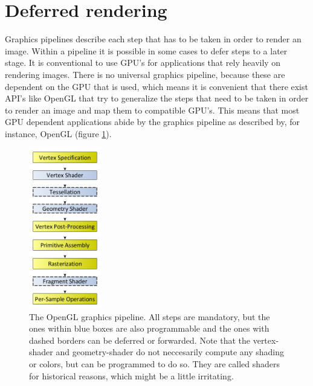 \documentclass{ACGSeminar}
\begin{document}
\section{Deferred rendering}
	Graphics pipelines describe each step that has to be taken in order to render an image. Within a pipeline it is possible in some cases to defer steps to a later stage. It is conventional to use GPU's for applications that rely heavily on rendering images. There is no universal graphics pipeline, because these are dependent on the GPU that is used, which means it is convenient that there exist API's like OpenGL that try to generalize the steps that need to be taken in order to render an image and map them to compatible GPU's. This means that most GPU dependent applications abide by the graphics pipeline as described by, for instance, OpenGL (figure \ref{fig:graphics_pipeline}).
	\begin{figure}[htb!]%
	\begin{center}%
		\includegraphics[height=7cm]{img/graphics_pipeline.png}
	\end{center}%
	\caption{The OpenGL graphics pipeline. All steps are mandatory, but the ones within blue boxes are also programmable and the ones with dashed borders can be deferred or forwarded. Note that the vertex-shader and geometry-shader do not neccesarily compute any shading or colors, but can be programmed to do so. They are called shaders for historical reasons, which might be a little irritating.}%
	\label{fig:graphics_pipeline}%
	\end{figure}%
\end{document}
